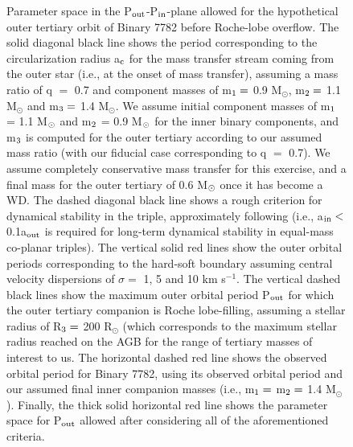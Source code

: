 \documentclass{aastex62}
\begin{document}
\begin{figure}[ht!]
\caption{Parameter space in the P$_{\rm out}$-P$_{\rm in}$-plane
  allowed for the hypothetical outer tertiary orbit of Binary 7782
  before Roche-lobe overflow.  The solid diagonal black line shows the
  period corresponding to the circularization radius a$_{\rm c}$ for
  the mass transfer stream coming from the outer star (i.e., at the
  onset of mass transfer), assuming a mass ratio of q $=$ 0.7 and
  component masses of m$_{\rm 1} =$ 0.9 M$_{\odot}$, m$_{\rm 2} =$ 1.1
  M$_{\odot}$ and m$_{\rm 3} =$ 1.4 M$_{\odot}$.  We assume initial
  component masses of m$_{\rm 1}$ = 1.1 M$_{\rm \odot}$ and m$_{\rm
    2}$ = 0.9 M$_{\rm \odot}$ for the inner binary components, and
  m$_{\rm 3}$ is computed for the outer tertiary according to our
  assumed mass ratio (with our fiducial case corresponding to q $=$
  0.7).  We assume completely conservative mass transfer for this
  exercise, and a final mass for the outer tertiary of 0.6 M$_{\rm
    \odot}$ once it has become a WD.  The dashed diagonal black line
  shows a rough criterion for dynamical stability in the triple,
  approximately following \citet{mardling99} (i.e., a$_{\rm in} <$
  0.1a$_{\rm out}$ is required for long-term dynamical stability in
  equal-mass co-planar triples).  The vertical solid red lines show
  the outer orbital periods corresponding to the hard-soft boundary
  assuming central velocity dispersions of $\sigma =$ 1, 5 and 10 km
  s$^{-1}$.  The vertical dashed black lines show the maximum outer
  orbital period P$_{\rm out}$ for which the outer tertiary companion
  is Roche lobe-filling, assuming a stellar radius of R$_{\rm 3} =$
  200 R$_{\odot}$ (which corresponds to the maximum stellar radius
  reached on the AGB for the range of tertiary masses of interest to
  us.  The horizontal dashed red line shows the observed orbital
  period for Binary 7782, using its observed orbital period and our
  assumed final inner companion masses (i.e., m$_{\rm 1} =$ m$_{\rm 2}
  =$ 1.4 M$_{\odot}$).  Finally, the thick solid horizontal red line
  shows the parameter space for P$_{\rm out}$ allowed after
  considering all of the aforementioned criteria.  
\label{fig:fig2}}
\end{figure}
\end{document}
